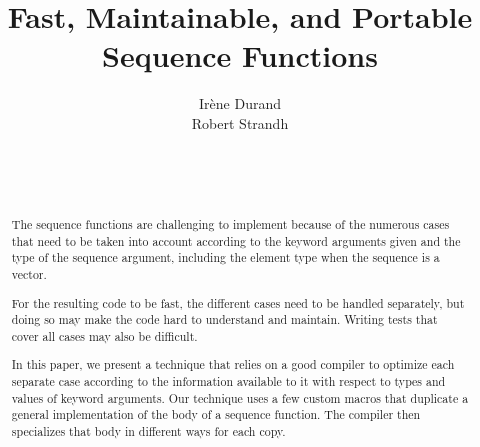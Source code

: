 \documentclass{sig-alternate-05-2015}
\begin{document}

\title{Fast, Maintainable, and Portable Sequence Functions
  }

\author{\alignauthor
Irène Durand\\
Robert Strandh\\
\\
\\
\\
}



\maketitle

\begin{abstract}
The \commonlisp{} sequence functions are challenging to implement
because of the numerous cases that need to be taken into account
according to the keyword arguments given and the type of the sequence
argument, including the element type when the sequence is a vector.

For the resulting code to be fast, the different cases need to be
handled separately, but doing so may make the code hard to understand
and maintain.  Writing tests that cover all cases may also be
difficult.

In this paper, we present a technique that relies on a good compiler
to optimize each separate case according to the information available
to it with respect to types and values of keyword arguments.  Our
technique uses a few custom macros that duplicate a general
implementation of the body of a sequence function.  The compiler then
specializes that body in different ways for each copy.
\end{abstract}
\end{document}
